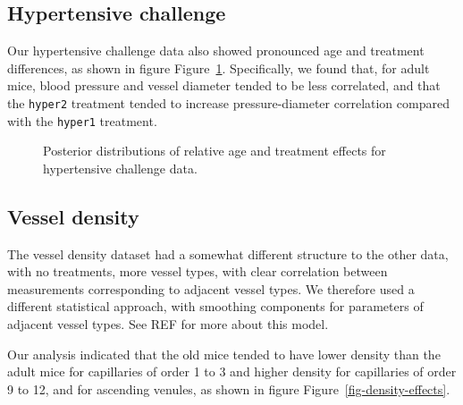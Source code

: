 \documentclass[
  letterpaper,
  DIV=11,
  numbers=noendperiod,
  oneside]{scrartcl}
\theoremstyle{plain}
\theoremstyle{remark}
\begin{document}
\subsection{Hypertensive challenge}\label{hypertensive-challenge}

Our hypertensive challenge data also showed pronounced age and treatment
differences, as shown in figure Figure~\ref{fig-hypertension-effects}.
Specifically, we found that, for adult mice, blood pressure and vessel
diameter tended to be less correlated, and that the \texttt{hyper2}
treatment tended to increase pressure-diameter correlation compared with
the \texttt{hyper1} treatment.

\begin{figure}


\caption{\label{fig-hypertension-effects}Posterior distributions of
relative age and treatment effects for hypertensive challenge data.}

\end{figure}%

\subsection{Vessel density}\label{vessel-density}

The vessel density dataset had a somewhat different structure to the
other data, with no treatments, more vessel types, with clear
correlation between measurements corresponding to adjacent vessel types.
We therefore used a different statistical approach, with smoothing
components for parameters of adjacent vessel types. See REF for more
about this model.

Our analysis indicated that the old mice tended to have lower density
than the adult mice for capillaries of order 1 to 3 and higher density
for capillaries of order 9 to 12, and for ascending venules, as shown in
figure Figure~\ref{fig-density-effects}.
\end{document}
